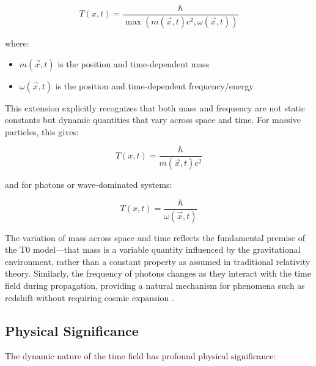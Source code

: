 \documentclass[12pt,a4paper]{article}
\newcommand{\Tfieldt}{T(x,t)}
\newcommand{\vecx}{\vec{x}}
\begin{document}
	\begin{equation}
		\Tfieldt = \frac{\hbar}{\max(m(\vecx,t)c^2, \omega(\vecx,t))}
		\label{eq:dynamic_time_field}
	\end{equation}
	
	where:
	\begin{itemize}
		\item $m(\vecx,t)$ is the position and time-dependent mass
		\item $\omega(\vecx,t)$ is the position and time-dependent frequency/energy
	\end{itemize}
	
	This extension explicitly recognizes that both mass and frequency are not static constants but dynamic quantities that vary across space and time. For massive particles, this gives:
	
	\begin{equation}
		\Tfieldt = \frac{\hbar}{m(\vecx,t)c^2}
		\label{eq:massive_dynamic}
	\end{equation}
	
	and for photons or wave-dominated systems:
	
	\begin{equation}
		\Tfieldt = \frac{\hbar}{\omega(\vecx,t)}
		\label{eq:photon_dynamic}
	\end{equation}
	
	The variation of mass across space and time reflects the fundamental premise of the T0 model—that mass is a variable quantity influenced by the gravitational environment, rather than a constant property as assumed in traditional relativity theory. Similarly, the frequency of photons changes as they interact with the time field during propagation, providing a natural mechanism for phenomena such as redshift without requiring cosmic expansion \cite{pascher_part2_2025}.
	
	\subsection{Physical Significance}
	\label{subsec:physical_significance}
	
	The dynamic nature of the time field has profound physical significance:
	
\end{document}
